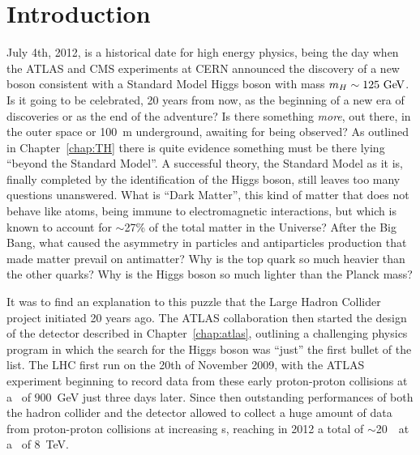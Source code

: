 \clearpage{\pagestyle{empty}\cleardoublepage}

\chapter*{Introduction}\label{chap:intro}

\vskip-2.5cm

July 4th, 2012, is a historical date for high energy physics,
being the day when the ATLAS and CMS experiments at CERN announced
the discovery of a new boson consistent with a Standard Model Higgs
boson with mass $m_H\sim 125\gev$. Is it going to be celebrated, 20 years
from now, as the beginning of a new era of discoveries or as the 
end of the adventure? Is there something {\it more}, out there, in 
the outer space or 100~m underground, awaiting for being observed?
As outlined in Chapter~\ref{chap:TH} there is quite evidence
something must be there lying ``beyond the Standard Model''. A
successful theory, the Standard Model as it is, finally completed
by the identification of the Higgs boson, still leaves too many questions
unanswered. What is ``Dark Matter'', this kind of matter that does not
behave like atoms, being immune to electromagnetic interactions, but which
is known to account for $\sim$27\% of the total matter in the Universe?
After the Big Bang, what caused the asymmetry in particles and
antiparticles production that made matter prevail on antimatter?
Why is the top quark so much heavier than the other quarks? Why is the
Higgs boson so much lighter than the Planck mass?

It was to find an explanation to this puzzle that the 
Large Hadron Collider project initiated 20 years ago. The ATLAS
collaboration then started the design of the detector described in
Chapter~\ref{chap:atlas}, outlining a challenging physics program
in which the search for the Higgs boson was ``just'' the first bullet
of the list.
The LHC first run on the 20th of November 2009, with the ATLAS
experiment beginning to record data from these early proton-proton
collisions at a \cme\ of $900$~GeV just three days later.
Since then outstanding performances of both the hadron collider
and the detector allowed to collect a huge amount of data
from proton-proton collisions at increasing \cme s, reaching in
2012 a total of $\sim$20~\ifb\ at a \cme\ of 8~TeV.

